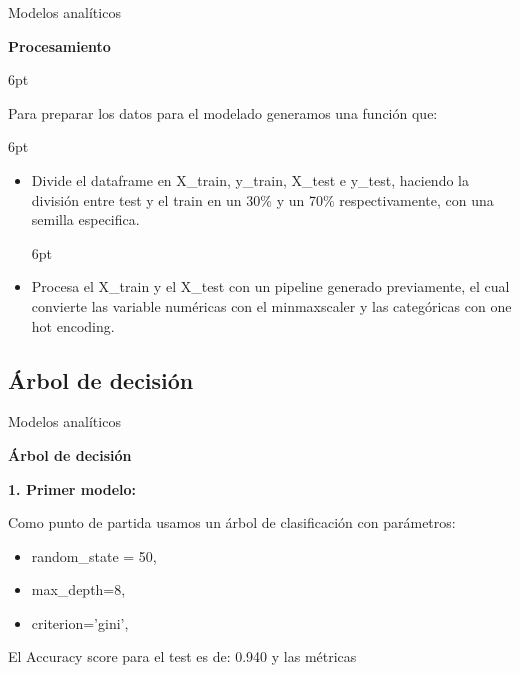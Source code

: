 \documentclass[pdf]{beamer}
\def\vspace{}%
\begin{document}
{\begin{frame}{Modelos analíticos}

    \begin{Large}
        \textbf{Procesamiento}
    \end{Large}
    \vspace{6pt}

    Para preparar los datos para el modelado generamos una función que:
    
    \vspace{6pt}
    \begin{itemize}
        \justifying%
        \item  Divide el dataframe en X\_train, y\_train, X\_test e y\_test, haciendo la división entre test y el train en un 30\% y un 70\% respectivamente, con una semilla especifica.
        
        \vspace{6pt}
        \item  Procesa el X\_train y el X\_test con un pipeline generado previamente, el cual convierte las variable numéricas con el minmaxscaler y las categóricas con one hot encoding.
    \end{itemize}



\end{frame}

    \subsection{Árbol de decisión}

        

\begin{frame}{Modelos analíticos}

    \begin{Large}
        \textbf{Árbol de decisión}
    \end{Large}

     \textbf{1. Primer modelo:}

    Como punto de partida usamos un árbol de clasificación con parámetros:
    \begin{itemize}
        \item random\_state = 50,
        \item max\_depth=8,
        \item criterion='gini',
    \end{itemize}

    El Accuracy score para el test es de: 0.940 y las métricas


\end{frame}}
\end{document}
